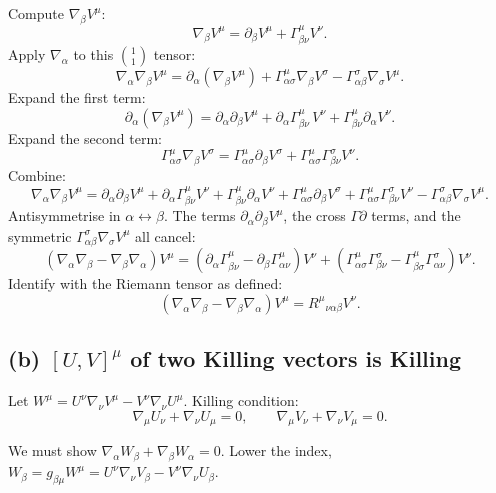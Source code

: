 \documentclass[11pt]{article}
\begin{document}
Compute $\nabla_\beta V^\mu$:
\[
\nabla_\beta V^\mu = \partial_\beta V^\mu + \Gamma^\mu_{\beta\nu}V^\nu.
\]
Apply $\nabla_\alpha$ to this $\binom{1}{1}$ tensor:
\[
\nabla_\alpha\nabla_\beta V^\mu = \partial_\alpha(\nabla_\beta V^\mu) + \Gamma^\mu_{\alpha\sigma}\nabla_\beta V^\sigma - \Gamma^\sigma_{\alpha\beta}\nabla_\sigma V^\mu.
\]
Expand the first term:
\[
\partial_\alpha(\nabla_\beta V^\mu) = \partial_\alpha\partial_\beta V^\mu + \partial_\alpha\Gamma^\mu_{\beta\nu}\,V^\nu + \Gamma^\mu_{\beta\nu}\partial_\alpha V^\nu.
\]
Expand the second term:
\[
\Gamma^\mu_{\alpha\sigma}\nabla_\beta V^\sigma = \Gamma^\mu_{\alpha\sigma}\partial_\beta V^\sigma + \Gamma^\mu_{\alpha\sigma}\Gamma^\sigma_{\beta\nu}V^\nu.
\]
Combine:
\[
\nabla_\alpha\nabla_\beta V^\mu = \partial_\alpha\partial_\beta V^\mu + \partial_\alpha\Gamma^\mu_{\beta\nu}V^\nu + \Gamma^\mu_{\beta\nu}\partial_\alpha V^\nu + \Gamma^\mu_{\alpha\sigma}\partial_\beta V^\sigma + \Gamma^\mu_{\alpha\sigma}\Gamma^\sigma_{\beta\nu}V^\nu - \Gamma^\sigma_{\alpha\beta}\nabla_\sigma V^\mu.
\]
Antisymmetrise in $\alpha\leftrightarrow\beta$. The terms $\partial_\alpha\partial_\beta V^\mu$, the cross $\Gamma\partial$ terms, and the symmetric $\Gamma^\sigma_{\alpha\beta}\nabla_\sigma V^\mu$ all cancel:
\[
(\nabla_\alpha\nabla_\beta - \nabla_\beta\nabla_\alpha)V^\mu = (\partial_\alpha\Gamma^\mu_{\beta\nu} - \partial_\beta\Gamma^\mu_{\alpha\nu})V^\nu + (\Gamma^\mu_{\alpha\sigma}\Gamma^\sigma_{\beta\nu} - \Gamma^\mu_{\beta\sigma}\Gamma^\sigma_{\alpha\nu})V^\nu.
\]
Identify with the Riemann tensor as defined:
\begin{equation}
\boxed{\;(\nabla_\alpha\nabla_\beta-\nabla_\beta\nabla_\alpha)V^\mu = R^\mu{}_{\nu\alpha\beta}V^\nu.\;}
\label{eq:ricciid}
\end{equation}

\subsection*{(b) $[U,V]^\mu$ of two Killing vectors is Killing}

Let $W^\mu = U^\nu\nabla_\nu V^\mu - V^\nu\nabla_\nu U^\mu$. Killing condition:
\begin{equation}
\nabla_\mu U_\nu + \nabla_\nu U_\mu = 0,\qquad \nabla_\mu V_\nu + \nabla_\nu V_\mu = 0.
\label{eq:killing}
\end{equation}

We must show $\nabla_\alpha W_\beta + \nabla_\beta W_\alpha = 0$. Lower the index, $W_\beta = g_{\beta\mu}W^\mu = U^\nu\nabla_\nu V_\beta - V^\nu\nabla_\nu U_\beta$.
\end{document}
